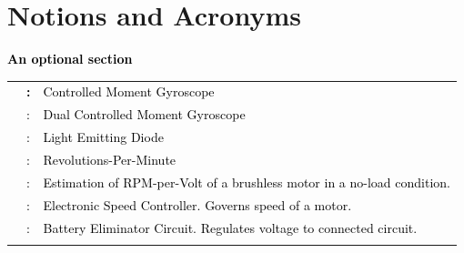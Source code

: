 \documentclass[a4paper]{article}
\begin{document}
\bigskip


\bigskip


\bigskip

\clearpage\section{Notions and Acronyms}
\hypertarget{Toc98342031}{}
\bigskip

\textbf{\textcolor{black}{An optional section}}


\bigskip

\begin{flushleft}
\tablefirsthead{}
\tablehead{}
\tabletail{}
\tablelasttail{}
\begin{supertabular}{m{1.52cm}m{0.32200003cm}m{13.557cm}}
 &
{\bfseries \textcolor{black}{:}} &
{ \textcolor{black}{Controlled Moment Gyroscope}}\\
 &
{ \textcolor{black}{:}} &
{ \textcolor{black}{Dual Controlled Moment Gyroscope}}\\
 &
{ \textcolor{black}{:}} &
{ \textcolor{black}{Light Emitting Diode}}\\
 &
{ \textcolor{black}{:}} &
{ \textcolor{black}{Revolutions-Per-Minute}}\\
 &
{ \textcolor{black}{:}} &
{ \textcolor{black}{Estimation of RPM-per-Volt of a brushless motor in a no-load condition.}}\\
 &
{ \textcolor{black}{:}} &
{ \textcolor{black}{Electronic Speed Controller. Governs speed of a motor.}}\\
 &
{ \textcolor{black}{:}} &
{ \textcolor{black}{Battery Eliminator Circuit. Regulates voltage to connected circuit.}}\\
 &

\end{supertabular}
\end{flushleft}
\end{document}
